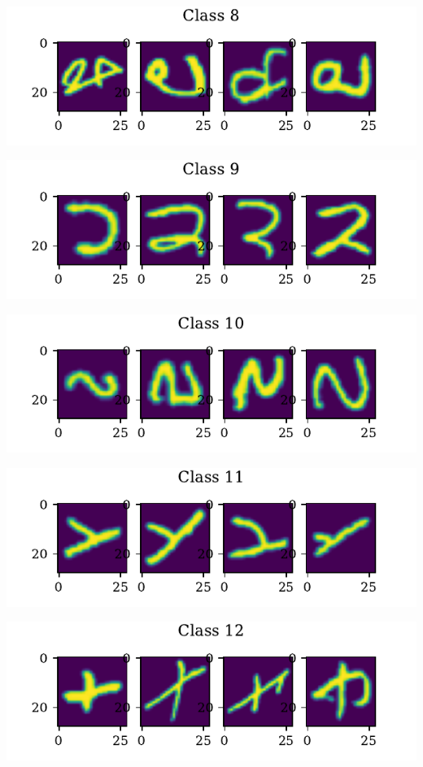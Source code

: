 \documentclass[11pt]{article}
\begin{document}
\includegraphics{figures/1a_sample_class_8.pdf}

\includegraphics{figures/1a_sample_class_9.pdf}

\includegraphics{figures/1a_sample_class_10.pdf}

\includegraphics{figures/1a_sample_class_11.pdf}

\includegraphics{figures/1a_sample_class_12.pdf}
\end{document}
